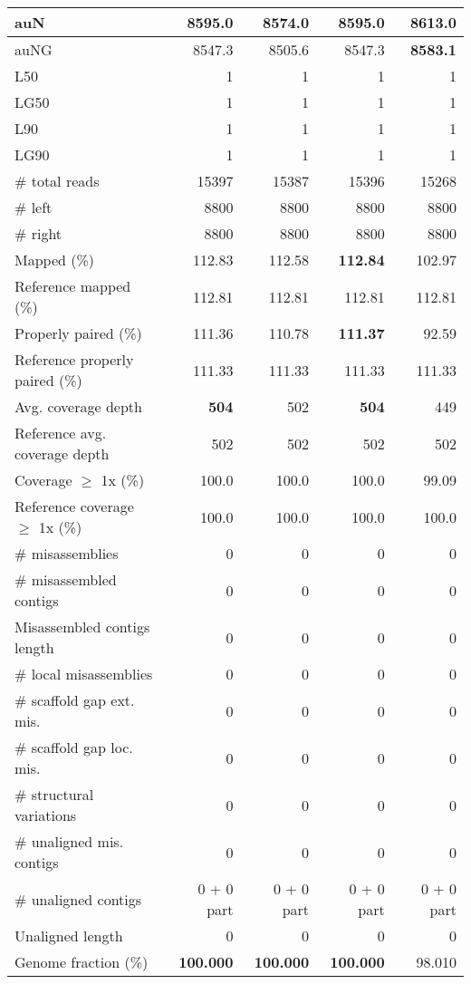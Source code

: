 \documentclass[12pt,a4paper]{article}
\begin{document}
\begin{table}[ht]
\begin{center}
\begin{tabular}{|l*{4}{|r}|}
auN & 8595.0 & 8574.0 & 8595.0 & {\bf 8613.0} \\ \hline
auNG & 8547.3 & 8505.6 & 8547.3 & {\bf 8583.1} \\ \hline
L50 & 1 & 1 & 1 & 1 \\ \hline
LG50 & 1 & 1 & 1 & 1 \\ \hline
L90 & 1 & 1 & 1 & 1 \\ \hline
LG90 & 1 & 1 & 1 & 1 \\ \hline
\# total reads & 15397 & 15387 & 15396 & 15268 \\ \hline
\# left & 8800 & 8800 & 8800 & 8800 \\ \hline
\# right & 8800 & 8800 & 8800 & 8800 \\ \hline
Mapped (\%) & 112.83 & 112.58 & {\bf 112.84} & 102.97 \\ \hline
Reference mapped (\%) & 112.81 & 112.81 & 112.81 & 112.81 \\ \hline
Properly paired (\%) & 111.36 & 110.78 & {\bf 111.37} & 92.59 \\ \hline
Reference properly paired (\%) & 111.33 & 111.33 & 111.33 & 111.33 \\ \hline
Avg. coverage depth & {\bf 504} & 502 & {\bf 504} & 449 \\ \hline
Reference avg. coverage depth & 502 & 502 & 502 & 502 \\ \hline
Coverage $\geq$ 1x (\%) & 100.0 & 100.0 & 100.0 & 99.09 \\ \hline
Reference coverage $\geq$ 1x (\%) & 100.0 & 100.0 & 100.0 & 100.0 \\ \hline
\# misassemblies & 0 & 0 & 0 & 0 \\ \hline
\# misassembled contigs & 0 & 0 & 0 & 0 \\ \hline
Misassembled contigs length & 0 & 0 & 0 & 0 \\ \hline
\# local misassemblies & 0 & 0 & 0 & 0 \\ \hline
\# scaffold gap ext. mis. & 0 & 0 & 0 & 0 \\ \hline
\# scaffold gap loc. mis. & 0 & 0 & 0 & 0 \\ \hline
\# structural variations & 0 & 0 & 0 & 0 \\ \hline
\# unaligned mis. contigs & 0 & 0 & 0 & 0 \\ \hline
\# unaligned contigs & 0 + 0 part & 0 + 0 part & 0 + 0 part & 0 + 0 part \\ \hline
Unaligned length & 0 & 0 & 0 & 0 \\ \hline
Genome fraction (\%) & {\bf 100.000} & {\bf 100.000} & {\bf 100.000} & 98.010 \\ \hline

\end{tabular}
\end{center}
\end{table}
\end{document}
